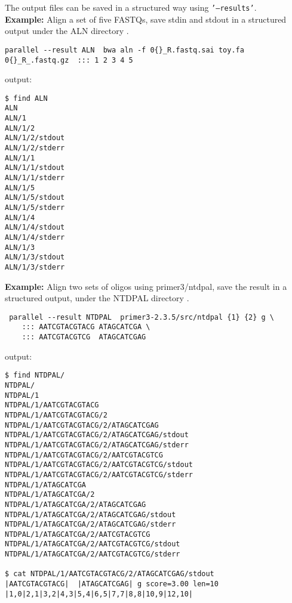\documentclass{article}
\newcommand{\example}[1]{
\textbf{Example: } {\color[rgb]{0,0,1} #1 } .
}
\newcommand{\cmdoption}[1]{\texttt{'#1'}}
\begin{document}
The output files can be saved in a structured way using \cmdoption{--results}.\\
\example{Align a set of five FASTQs, save stdin and stdout in a structured output under the ALN directory}
\begin{lstlisting}
parallel --result ALN  bwa aln -f 0{}_R.fastq.sai toy.fa 0{}_R_.fastq.gz  ::: 1 2 3 4 5
\end{lstlisting}
output:
\begin{lstlisting}
$ find ALN
ALN
ALN/1
ALN/1/2
ALN/1/2/stdout
ALN/1/2/stderr
ALN/1/1
ALN/1/1/stdout
ALN/1/1/stderr
ALN/1/5
ALN/1/5/stdout
ALN/1/5/stderr
ALN/1/4
ALN/1/4/stdout
ALN/1/4/stderr
ALN/1/3
ALN/1/3/stdout
ALN/1/3/stderr
\end{lstlisting}

\example{Align two sets of oligos using primer3/ntdpal, save the result in a structured output, under the NTDPAL directory}
\begin{lstlisting}
 parallel --result NTDPAL  primer3-2.3.5/src/ntdpal {1} {2} g \
 	::: AATCGTACGTACG ATAGCATCGA \
 	::: AATCGTACGTCG  ATAGCATCGAG
\end{lstlisting}
output:
\begin{lstlisting}
$ find NTDPAL/
NTDPAL/
NTDPAL/1
NTDPAL/1/AATCGTACGTACG
NTDPAL/1/AATCGTACGTACG/2
NTDPAL/1/AATCGTACGTACG/2/ATAGCATCGAG
NTDPAL/1/AATCGTACGTACG/2/ATAGCATCGAG/stdout
NTDPAL/1/AATCGTACGTACG/2/ATAGCATCGAG/stderr
NTDPAL/1/AATCGTACGTACG/2/AATCGTACGTCG
NTDPAL/1/AATCGTACGTACG/2/AATCGTACGTCG/stdout
NTDPAL/1/AATCGTACGTACG/2/AATCGTACGTCG/stderr
NTDPAL/1/ATAGCATCGA
NTDPAL/1/ATAGCATCGA/2
NTDPAL/1/ATAGCATCGA/2/ATAGCATCGAG
NTDPAL/1/ATAGCATCGA/2/ATAGCATCGAG/stdout
NTDPAL/1/ATAGCATCGA/2/ATAGCATCGAG/stderr
NTDPAL/1/ATAGCATCGA/2/AATCGTACGTCG
NTDPAL/1/ATAGCATCGA/2/AATCGTACGTCG/stdout
NTDPAL/1/ATAGCATCGA/2/AATCGTACGTCG/stderr

$ cat NTDPAL/1/AATCGTACGTACG/2/ATAGCATCGAG/stdout
|AATCGTACGTACG|  |ATAGCATCGAG| g score=3.00 len=10 |1,0|2,1|3,2|4,3|5,4|6,5|7,7|8,8|10,9|12,10|
\end{lstlisting}
\end{document}
